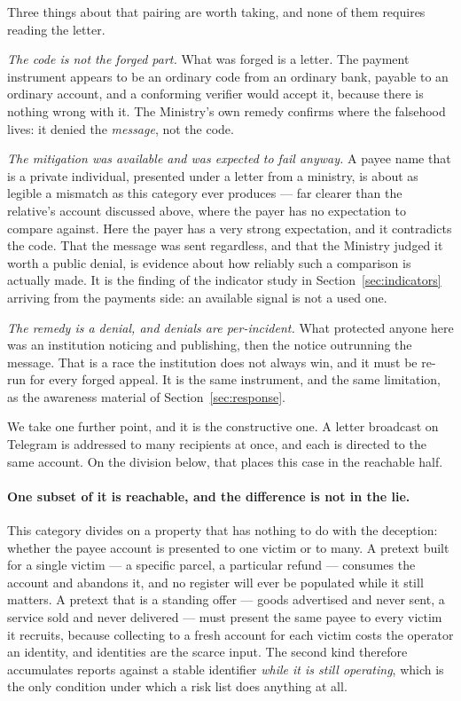 \documentclass[10pt,a4paper,twocolumn]{article}
\begin{document}
Three things about that pairing are worth taking, and none of them requires
reading the letter.

\emph{The code is not the forged part.} What was forged is a letter. The
payment instrument appears to be an ordinary code from an ordinary bank,
payable to an ordinary account, and a conforming verifier would accept it,
because there is nothing wrong with it. The Ministry's own remedy confirms
where the falsehood lives: it denied the \emph{message}, not the code.

\emph{The mitigation was available and was expected to fail anyway.} A payee
name that is a private individual, presented under a letter from a ministry, is
about as legible a mismatch as this category ever produces --- far clearer than
the relative's account discussed above, where the payer has no expectation to
compare against. Here the payer has a very strong expectation, and it
contradicts the code. That the message was sent regardless, and that the
Ministry judged it worth a public denial, is evidence about how reliably such a
comparison is actually made. It is the finding of the indicator study in
Section~\ref{sec:indicators} arriving from the payments side: an available
signal is not a used one.

\emph{The remedy is a denial, and denials are per-incident.} What protected
anyone here was an institution noticing and publishing, then the notice
outrunning the message. That is a race the institution does not always win, and
it must be re-run for every forged appeal. It is the same instrument, and the
same limitation, as the awareness material of Section~\ref{sec:response}.

We take one further point, and it is the constructive one. A letter broadcast on
Telegram is addressed to many recipients at once, and each is directed to the
same account. On the division below, that places this case in the reachable
half.

\paragraph{One subset of it is reachable, and the difference is not in the lie.}
This category divides on a property that has nothing to do with the deception:
whether the payee account is presented to one victim or to many. A pretext built
for a single victim --- a specific parcel, a particular refund --- consumes the
account and abandons it, and no register will ever be populated while it still
matters. A pretext that is a standing offer --- goods advertised and never sent,
a service sold and never delivered --- must present the same payee to every
victim it recruits, because collecting to a fresh account for each victim costs
the operator an identity, and identities are the scarce input. The second kind
therefore accumulates reports against a stable identifier \emph{while it is
still operating}, which is the only condition under which a risk list does
anything at all.
\end{document}
